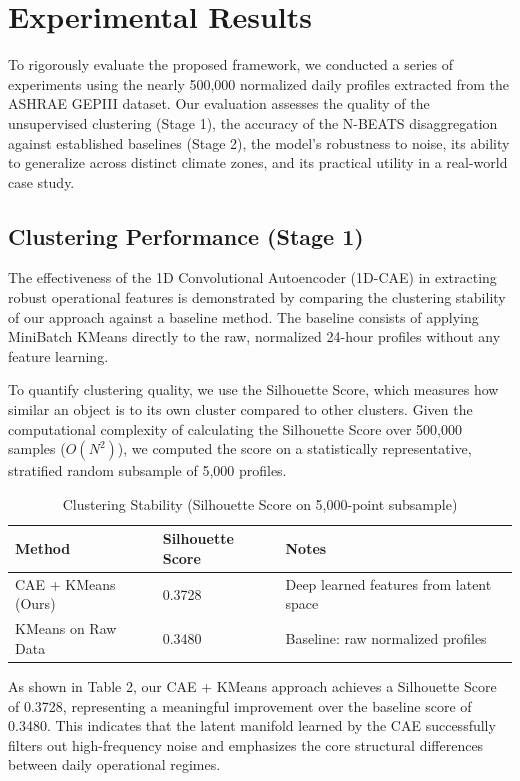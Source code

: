 \section{Experimental Results}

To rigorously evaluate the proposed framework, we conducted a series of experiments using the nearly 500,000 normalized daily profiles extracted from the ASHRAE GEPIII dataset. Our evaluation assesses the quality of the unsupervised clustering (Stage 1), the accuracy of the N-BEATS disaggregation against established baselines (Stage 2), the model's robustness to noise, its ability to generalize across distinct climate zones, and its practical utility in a real-world case study.

\subsection{Clustering Performance (Stage 1)}
The effectiveness of the 1D Convolutional Autoencoder (1D-CAE) in extracting robust operational features is demonstrated by comparing the clustering stability of our approach against a baseline method. The baseline consists of applying MiniBatch KMeans directly to the raw, normalized 24-hour profiles without any feature learning.

To quantify clustering quality, we use the Silhouette Score, which measures how similar an object is to its own cluster compared to other clusters. Given the computational complexity of calculating the Silhouette Score over 500,000 samples ($O(N^2)$), we computed the score on a statistically representative, stratified random subsample of 5,000 profiles.

\begin{table}[H]
\caption{Clustering Stability (Silhouette Score on 5,000-point subsample)}
\begin{center}
\begin{tabular}{l l l}
\toprule
\textbf{Method} & \textbf{Silhouette Score} & \textbf{Notes} \\
\midrule
CAE + KMeans (Ours) & 0.3728 & Deep learned features from latent space \\
KMeans on Raw Data & 0.3480 & Baseline: raw normalized profiles \\
\bottomrule
\end{tabular}
\end{center}
\end{table}

As shown in Table 2, our CAE + KMeans approach achieves a Silhouette Score of 0.3728, representing a meaningful improvement over the baseline score of 0.3480. This indicates that the latent manifold learned by the CAE successfully filters out high-frequency noise and emphasizes the core structural differences between daily operational regimes.

